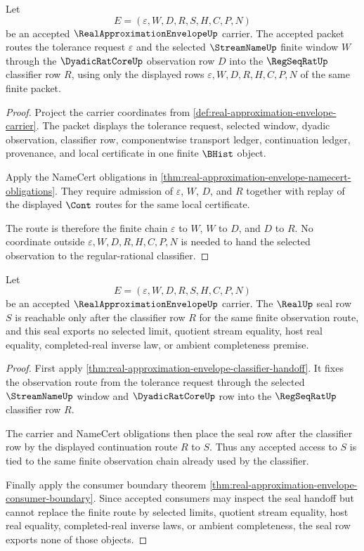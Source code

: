 \begin{theorem}
\label{thm:real-approximation-envelope-classifier-handoff}
Let
$$
E=(\varepsilon,W,D,R,S,H,C,P,N)
$$
be an accepted $\RealApproximationEnvelopeUp$ carrier. The accepted packet routes the tolerance request $\varepsilon$ and the selected $\StreamNameUp$ finite window $W$ through the $\DyadicRatCoreUp$ observation row $D$ into the $\RegSeqRatUp$ classifier row $R$, using only the displayed rows $\varepsilon,W,D,R,H,C,P,N$ of the same finite packet.
\end{theorem}
\begin{proof}
Project the carrier coordinates from \autoref{def:real-approximation-envelope-carrier}. The packet displays the tolerance request, selected window, dyadic observation, classifier row, componentwise transport ledger, continuation ledger, provenance, and local certificate in one finite $\BHist$ object.

Apply the NameCert obligations in \autoref{thm:real-approximation-envelope-namecert-obligations}. They require admission of $\varepsilon$, $W$, $D$, and $R$ together with replay of the displayed $\Cont$ routes for the same local certificate.

The route is therefore the finite chain $\varepsilon$ to $W$, $W$ to $D$, and $D$ to $R$. No coordinate outside $\varepsilon,W,D,R,H,C,P,N$ is needed to hand the selected observation to the regular-rational classifier.
\end{proof}

\begin{theorem}
\label{thm:real-approximation-envelope-seal-routing}
Let
$$
E=(\varepsilon,W,D,R,S,H,C,P,N)
$$
be an accepted $\RealApproximationEnvelopeUp$ carrier. The $\RealUp$ seal row $S$ is reachable only after the classifier row $R$ for the same finite observation route, and this seal exports no selected limit, quotient stream equality, host real equality, completed-real inverse law, or ambient completeness premise.
\end{theorem}
\begin{proof}
First apply \autoref{thm:real-approximation-envelope-classifier-handoff}. It fixes the observation route from the tolerance request through the selected $\StreamNameUp$ window and $\DyadicRatCoreUp$ row into the $\RegSeqRatUp$ classifier row $R$.

The carrier and NameCert obligations then place the seal row after the classifier row by the displayed continuation route $R$ to $S$. Thus any accepted access to $S$ is tied to the same finite observation chain already used by the classifier.

Finally apply the consumer boundary theorem \autoref{thm:real-approximation-envelope-consumer-boundary}. Since accepted consumers may inspect the seal handoff but cannot replace the finite route by selected limits, quotient stream equality, host real equality, completed-real inverse laws, or ambient completeness, the seal row exports none of those objects.
\end{proof}

